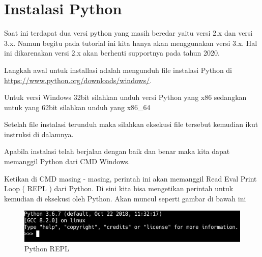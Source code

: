 \section{Instalasi Python}
Saat ini terdapat dua versi python yang masih beredar yaitu versi 2.x dan versi 3.x.
Namun begitu pada tutorial ini kita hanya akan menggunakan versi 3.x. Hal ini dikarenakan
versi 2.x akan berhenti supportnya pada tahun 2020.

Langkah awal untuk installasi adalah mengunduh file instalasi Python di \url{https://www.python.org/downloads/windows/}.

Untuk versi Windows 32bit silahkan unduh versi Python yang x86 sedangkan untuk yang 62bit silahkan unduh yang x86\_64

Setelah file instalasi terunduh maka silahkan eksekusi file tersebut kemudian ikut instruksi di dalamnya.

Apabila instalasi telah berjalan dengan baik dan benar maka kita dapat memanggil Python dari CMD Windows. 

Ketikan  di CMD masing - masing, perintah ini akan memanggil Read Eval Print Loop ( REPL ) dari Python.
Di sini kita bisa mengetikan perintah untuk kemudian di eksekusi oleh Python. Akan muncul seperti gambar di bawah ini
\begin{figure}[h]
\begin{center}
\includegraphics[width=0.8\linewidth]{img/python}
\caption{Python REPL}
\end{center}
\end{figure}
\newpage


